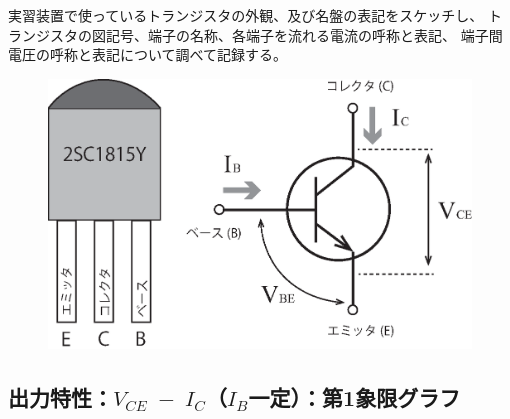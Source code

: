 \documentclass[uplatex,a4paper,11pt,oneside,openany]{jsbook}
\begin{document}
実習装置で使っているトランジスタの外観、及び名盤の表記をスケッチし、
トランジスタの図記号、端子の名称、各端子を流れる電流の呼称と表記、
端子間電圧の呼称と表記について調べて記録する。\\

\begin{figure}[H]
	\centering
	\includegraphics[keepaspectratio, scale=0.6, angle=0]
	{figs/eps/illust.eps}
	\label{fig:illust}
\end{figure}

\newpage

\subsection{出力特性：$V_{CE}\;-\;I_C$（$I_B$一定）：第1象限グラフ}
\end{document}
